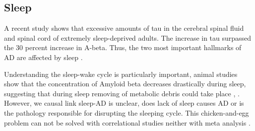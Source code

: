 \documentclass[11pt]{article}
\theoremstyle{definition}
\theoremstyle{remark}
\begin{document}
\subsection{Sleep}
\label{ssse:sleep}

A recent study shows that excessive amounts of tau in the cerebral spinal fluid and spinal cord of extremely sleep-deprived adults. The increase in tau surpassed the 30 percent increase in A-beta. Thus, the two most important hallmarks of AD are affected by sleep \cite{holth2019sleep}.

Understanding the sleep-wake cycle is particularly important, animal studies show that the concentration of Amyloid beta decreases drastically during sleep, suggesting that during sleep removing of metabolic debris could take place \cite{kang2009amyloid}, \cite{xie2013sleep}. However, we causal link sleep-AD is unclear, does lack of sleep causes AD or is the pathology  responsible for disrupting the sleeping cycle. 
This chicken-and-egg problem can not be solved with correlational studies neither with meta analysis \cite{bubu2016sleep}.
\end{document}
